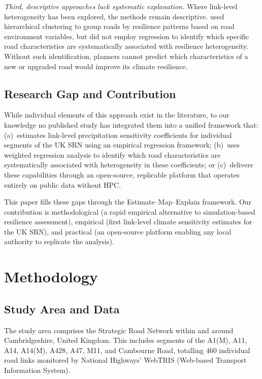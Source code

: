 \documentclass[review]{elsarticle}
\begin{document}
\textit{Third, descriptive approaches lack systematic explanation.} Where link-level heterogeneity has been explored, the methods remain descriptive. \citet{gao2024resilience} used hierarchical clustering to group roads by resilience patterns based on road environment variables, but did not employ regression to identify which specific road characteristics are systematically associated with resilience heterogeneity. Without such identification, planners cannot predict which characteristics of a new or upgraded road would improve its climate resilience.

\subsection{Research Gap and Contribution}
\label{sec:lit:gap}

While individual elements of this approach exist in the literature, to our knowledge no published study has integrated them into a unified framework that: (a)~estimates link-level precipitation sensitivity coefficients for individual segments of the UK SRN using an empirical regression framework; (b)~uses weighted regression analysis to identify which road characteristics are systematically associated with heterogeneity in these coefficients; or (c)~delivers these capabilities through an open-source, replicable platform that operates entirely on public data without HPC.

This paper fills these gaps through the Estimate--Map--Explain framework. Our contribution is methodological (a rapid empirical alternative to simulation-based resilience assessment), empirical (first link-level climate sensitivity estimates for the UK SRN), and practical (an open-source platform enabling any local authority to replicate the analysis).


\section{Methodology}
\label{sec:method}

\subsection{Study Area and Data}
\label{sec:method:data}

The study area comprises the Strategic Road Network within and around Cambridgeshire, United Kingdom. This includes segments of the A1(M), A11, A14, A14(M), A428, A47, M11, and Cambourne Road, totalling 460 individual road links monitored by National Highways' WebTRIS (Web-based Transport Information System).
\end{document}
